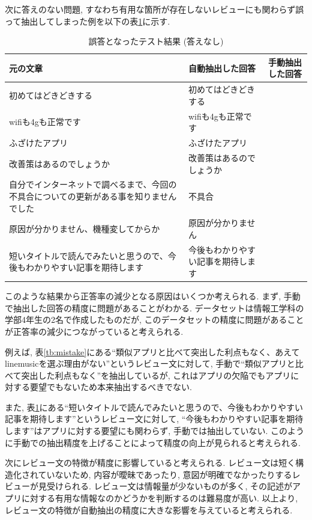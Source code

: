 次に答えのない問題, すなわち有用な箇所が存在しないレビューにも関わらず誤って抽出してしまった例を以下の表\ref{tb:mistake2}に示す.

\begin{table}[H]
  \caption{誤答となったテスト結果 (答えなし) }
  \label{tb:mistake2}
  \begin{center}
  \begin{tabularx}{\linewidth}{X|X|X}
    \hline
    元の文章&自動抽出した回答&手動抽出した回答\\\hline\hline
    初めてはどきどきする&初めてはどきどきする&\\\hline
    wifiも4gも正常です&wifiも4gも正常です&\\\hline
    ふざけたアプリ&ふざけたアプリ&\\\hline
    改善策はあるのでしょうか&改善策はあるのでしょうか&\\\hline
    自分でインターネットで調べるまで、今回の不具合についての更新がある事を知りませんでした&不具合&\\\hline
    原因が分かりません、機種変してからか&原因が分かりません&\\\hline
    短いタイトルで読んでみたいと思うので、今後もわかりやすい記事を期待します&今後もわかりやすい記事を期待します&\\\hline
  \end{tabularx}\end{center}
\end{table}

このような結果から正答率の減少となる原因はいくつか考えられる. まず, 手動で抽出した回答の精度に問題があることがわかる. データセットは情報工学科の学部4年生の2名で作成したものだが, このデータセットの精度に問題があることが正答率の減少につながっていると考えられる. 

例えば, 表\ref{tb:mistake}にある``類似アプリと比べて突出した利点もなく、あえてlinemusicを選ぶ理由がない''というレビュー文に対して, 手動で``類似アプリと比べて突出した利点もなく''を抽出しているが, これはアプリの欠陥でもアプリに対する要望でもないため本来抽出するべきでない. 

また, 表\ref{tb:mistake2}にある``短いタイトルで読んでみたいと思うので、今後もわかりやすい記事を期待します''というレビュー文に対して, ``今後もわかりやすい記事を期待します''はアプリに対する要望にも関わらず, 手動では抽出していない. このように手動での抽出精度を上げることによって精度の向上が見られると考えられる. 

次にレビュー文の特徴が精度に影響していると考えられる. レビュー文は短く構造化されていないため, 内容が曖昧であったり, 意図が明確でなかったりするレビューが見受けられる. レビュー文は情報量が少ないものが多く, その記述がアプリに対する有用な情報なのかどうかを判断するのは難易度が高い. 以上より, レビュー文の特徴が自動抽出の精度に大きな影響を与えていると考えられる. 

